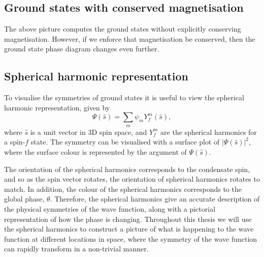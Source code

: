 \subsection{Ground states with conserved magnetisation}
The above picture computes the ground states without explicitly conserving
magnetisation.
However, if we enforce that magnetisation be conserved, then the ground state
phase diagram changes even further.


\subsection{Spherical harmonic representation}
To visualise the symmetries of ground states it is useful to view the spherical
harmonic representation, given by
\begin{equation}
    \Psi(\hat{s}) = \sum_m\psi_m Y_f^m(\hat{s}),
    \label{eq: spherical-harmonics}
\end{equation}
where \(\hat{s}\) is a unit vector in 3D spin space, and \(Y_f^m \) are the
spherical harmonics for a spin-\(f\) state.
The symmetry can be visualised with a surface plot of \(|\Psi(\hat{s})|^2\),
where the surface colour is represented by the argument of \(\Psi(\hat{s})\).

The orientation of the spherical harmonics corresponds to the condensate spin,
and so as the spin vector rotates, the orientation of spherical harmonics
rotates to match.
In addition, the colour of the spherical harmonics corresponds to the global
phase, \( \theta \).
Therefore, the spherical harmonics give an accurate description of the
physical symmetries of the wave function, along with a pictorial representation
of how the phase is changing.
Throughout this thesis we will use the spherical harmonics to construct a
picture of what is happening to the wave function at different locations in
space, where the symmetry of the wave function can rapidly transform in a
non-trivial manner.

